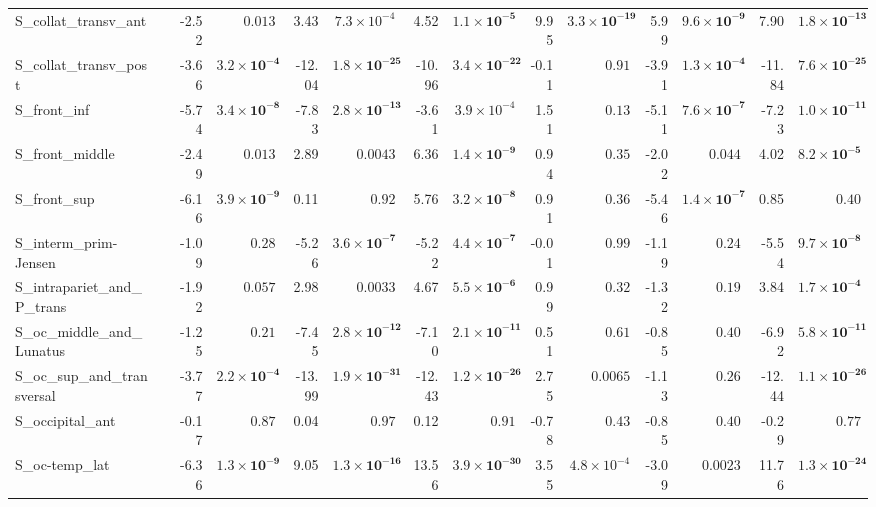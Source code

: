 {\begin{longtable}{llrrrrrrrrrrrr}
S\_collat\_transv\_ant &  & -2.52 & $0.013$ & 3.43 & $7.3{\times}10^{-4}$ & 4.52 & $\mathbf{1.1{\times}10^{-5}}$ & 9.95 & $\mathbf{3.3{\times}10^{-19}}$ & 5.99 & $\mathbf{9.6{\times}10^{-9}}$ & 7.90 & $\mathbf{1.8{\times}10^{-13}}$ \\
S\_collat\_transv\_post &  & -3.66 & $\mathbf{3.2{\times}10^{-4}}$ & -12.04 & $\mathbf{1.8{\times}10^{-25}}$ & -10.96 & $\mathbf{3.4{\times}10^{-22}}$ & -0.11 & $0.91$ & -3.91 & $\mathbf{1.3{\times}10^{-4}}$ & -11.84 & $\mathbf{7.6{\times}10^{-25}}$ \\
S\_front\_inf &  & -5.74 & $\mathbf{3.4{\times}10^{-8}}$ & -7.83 & $\mathbf{2.8{\times}10^{-13}}$ & -3.61 & $3.9{\times}10^{-4}$ & 1.51 & $0.13$ & -5.11 & $\mathbf{7.6{\times}10^{-7}}$ & -7.23 & $\mathbf{1.0{\times}10^{-11}}$ \\
S\_front\_middle &  & -2.49 & $0.013$ & 2.89 & $0.0043$ & 6.36 & $\mathbf{1.4{\times}10^{-9}}$ & 0.94 & $0.35$ & -2.02 & $0.044$ & 4.02 & $\mathbf{8.2{\times}10^{-5}}$ \\
S\_front\_sup &  & -6.16 & $\mathbf{3.9{\times}10^{-9}}$ & 0.11 & $0.92$ & 5.76 & $\mathbf{3.2{\times}10^{-8}}$ & 0.91 & $0.36$ & -5.46 & $\mathbf{1.4{\times}10^{-7}}$ & 0.85 & $0.40$ \\
S\_interm\_prim-Jensen &  & -1.09 & $0.28$ & -5.26 & $\mathbf{3.6{\times}10^{-7}}$ & -5.22 & $\mathbf{4.4{\times}10^{-7}}$ & -0.01 & $0.99$ & -1.19 & $0.24$ & -5.54 & $\mathbf{9.7{\times}10^{-8}}$ \\
S\_intrapariet\_and\_P\_trans &  & -1.92 & $0.057$ & 2.98 & $0.0033$ & 4.67 & $\mathbf{5.5{\times}10^{-6}}$ & 0.99 & $0.32$ & -1.32 & $0.19$ & 3.84 & $\mathbf{1.7{\times}10^{-4}}$ \\
S\_oc\_middle\_and\_Lunatus &  & -1.25 & $0.21$ & -7.45 & $\mathbf{2.8{\times}10^{-12}}$ & -7.10 & $\mathbf{2.1{\times}10^{-11}}$ & 0.51 & $0.61$ & -0.85 & $0.40$ & -6.92 & $\mathbf{5.8{\times}10^{-11}}$ \\
S\_oc\_sup\_and\_transversal &  & -3.77 & $\mathbf{2.2{\times}10^{-4}}$ & -13.99 & $\mathbf{1.9{\times}10^{-31}}$ & -12.43 & $\mathbf{1.2{\times}10^{-26}}$ & 2.75 & $0.0065$ & -1.13 & $0.26$ & -12.44 & $\mathbf{1.1{\times}10^{-26}}$ \\
S\_occipital\_ant &  & -0.17 & $0.87$ & 0.04 & $0.97$ & 0.12 & $0.91$ & -0.78 & $0.43$ & -0.85 & $0.40$ & -0.29 & $0.77$ \\
S\_oc-temp\_lat &  & -6.36 & $\mathbf{1.3{\times}10^{-9}}$ & 9.05 & $\mathbf{1.3{\times}10^{-16}}$ & 13.56 & $\mathbf{3.9{\times}10^{-30}}$ & 3.55 & $4.8{\times}10^{-4}$ & -3.09 & $0.0023$ & 11.76 & $\mathbf{1.3{\times}10^{-24}}$ \\

\end{longtable}}
